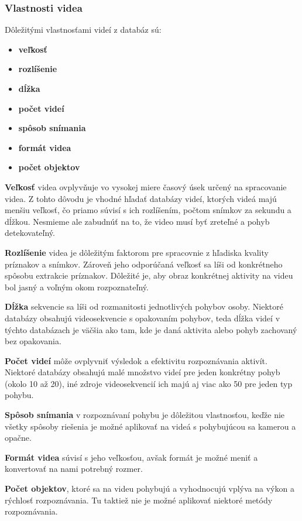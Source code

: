 \subsubsection{Vlastnosti videa} Dôležitými vlastnosťami videí z databáz sú:
\begin{itemize}
\item \textbf{veľkosť}
\item \textbf{rozlíšenie}
\item \textbf{dĺžka}
\item \textbf{počet videí}
\item \textbf{spôsob snímania}
\item \textbf{formát videa}
\item \textbf{počet objektov}
\end{itemize}

\textbf{Veľkosť} videa ovplyvňuje vo vysokej miere časový úsek určený na spracovanie videa. Z tohto dôvodu je vhodné hľadať databázy videí, ktorých videá majú menšiu veľkosť, čo priamo súvisí s ich rozlíšením, počtom snímkov za sekundu a dĺžkou. Nesmieme ale zabudnúť na to, že video musí byť zreteľné a pohyb detekovateľný.

\textbf{Rozlíšenie} videa je dôležitým faktorom pre spracovnie z hľadiska kvality príznakov a snímkov. Zároveň jeho odporúčaná veľkosť sa líši od konkrétneho spôsobu extrakcie príznakov. Dôležité je, aby obraz konkrétnej aktivity na videu bol jasný a voľným okom rozpoznateľný.

\textbf{Dĺžka} sekvencie sa líši od rozmanitosti jednotlivých pohybov osoby. Niektoré databázy obsahujú videosekvencie s opakovaním pohybov, teda dĺžka videí v týchto databázach je väčšia ako tam, kde je daná aktivita alebo pohyb zachovaný bez opakovania.

\textbf{Počet videí} môže ovplyvniť výsledok a efektivitu rozpoznávania aktivít. Niektoré databázy obsahujú malé množstvo videí pre jeden konkrétny pohyb (okolo 10 až 20), iné zdroje videosekvencií ich majú aj viac ako 50 pre jeden typ pohybu.

\textbf{Spôsob snímania} v rozpoznávaní pohybu je dôležitou vlastnosťou, keďže nie všetky spôsoby riešenia je možné aplikovať na videá s pohybujúcou sa kamerou a opačne. 

\textbf{Formát videa} súvisí s jeho veľkosťou, avšak formát je možné meniť a konvertovať na nami potrebný rozmer.

\textbf{Počet objektov}, ktoré sa na videu pohybujú a vyhodnocujú vplýva na výkon a rýchlosť rozpoznávania. Tu taktiež nie je možné aplikovať niektoré metódy rozpoznávania.

